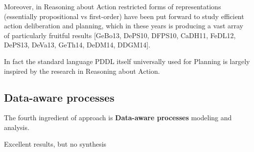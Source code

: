 Moreover, in Reasoning about Action restricted forms of representations
(essentially propositional vs first-order) have been put forward to study efficient
action deliberation and planning, which in these years is producing a
vast array of particularly fruitful results [GeBo13, DePS10, DFPS10,
CaDH11, FeDL12, DePS13, DeVa13, GeTh14, DeDM14, DDGM14].

In fact  the standard language PDDL itself universally used for Planning is largely inspired by the research in Reasoning about Action.


\subsection{Data-aware processes}

The fourth ingredient of \project approach is \textbf{Data-aware processes} modeling and analysis.

Excellent results, but no synthesis



% 





